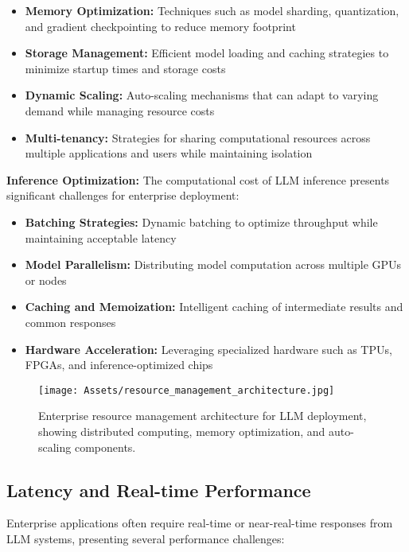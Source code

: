 \begin{itemize}
    \item \textbf{Memory Optimization:} Techniques such as model sharding, quantization, and gradient checkpointing to reduce memory footprint
    \item \textbf{Storage Management:} Efficient model loading and caching strategies to minimize startup times and storage costs
    \item \textbf{Dynamic Scaling:} Auto-scaling mechanisms that can adapt to varying demand while managing resource costs
    \item \textbf{Multi-tenancy:} Strategies for sharing computational resources across multiple applications and users while maintaining isolation
\end{itemize}

\textbf{Inference Optimization:}
The computational cost of LLM inference presents significant challenges for enterprise deployment:

\begin{itemize}
    \item \textbf{Batching Strategies:} Dynamic batching to optimize throughput while maintaining acceptable latency
    \item \textbf{Model Parallelism:} Distributing model computation across multiple GPUs or nodes
    \item \textbf{Caching and Memoization:} Intelligent caching of intermediate results and common responses
    \item \textbf{Hardware Acceleration:} Leveraging specialized hardware such as TPUs, FPGAs, and inference-optimized chips
\end{itemize}

\begin{figure}[H]
    \centering
    \texttt{[image: Assets/resource\_management\_architecture.jpg]}
    \caption{Enterprise resource management architecture for LLM deployment, showing distributed computing, memory optimization, and auto-scaling components.}
    \label{fig:resource_management_architecture}
\end{figure}

\subsection{Latency and Real-time Performance}

Enterprise applications often require real-time or near-real-time responses from LLM systems, presenting several performance challenges:


